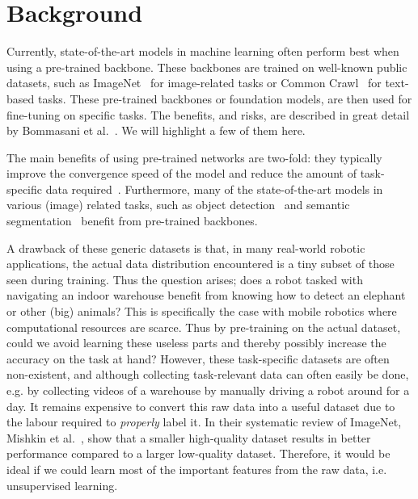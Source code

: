 \chapter{Background}\label{chapter:background}
Currently, state-of-the-art models in machine learning often perform best when using a pre-trained backbone. These backbones are trained on well-known public datasets, such as ImageNet~\cite{deng2009imagenet} for image-related tasks or Common Crawl~\cite{commoncrawl} for text-based tasks. These pre-trained backbones or foundation models, are then used for fine-tuning on specific tasks. The benefits, and risks, are described in great detail by Bommasani et al.~\cite{DBLP:journals/corr/abs-2108-07258}. We will highlight a few of them here.

The main benefits of using pre-trained networks are two-fold: they typically improve the convergence speed of the model and reduce the amount of task-specific data required~\cite{donahue2014decaf,zeiler2014visualizing}. Furthermore, many of the state-of-the-art models in various (image) related tasks, such as object detection~\cite{liu2016ssd,redmon2016you} and semantic segmentation~\cite{orsic2019defense,girshick2014rich} benefit from pre-trained backbones.

A drawback of these generic datasets is that, in many real-world robotic applications, the actual data distribution encountered is a tiny subset of those seen during training. Thus the question arises; does a robot tasked with navigating an indoor warehouse benefit from knowing how to detect an elephant or other (big) animals? This is specifically the case with mobile robotics where computational resources are scarce. Thus by pre-training on the actual dataset, could we avoid learning these useless parts and thereby possibly increase the accuracy on the task at hand? However, these task-specific datasets are often non-existent, and although collecting task-relevant data can often easily be done, e.g. by collecting videos of a warehouse by manually driving a robot around for a day. It remains expensive to convert this raw data into a useful dataset due to the labour required to \emph{properly} label it.
In their systematic review of ImageNet, Mishkin et al.~\cite{MISHKIN201711}, show that a smaller high-quality dataset results in better performance compared to a larger low-quality dataset. Therefore, it would be ideal if we could learn most of the important features from the raw data, i.e. unsupervised learning.

